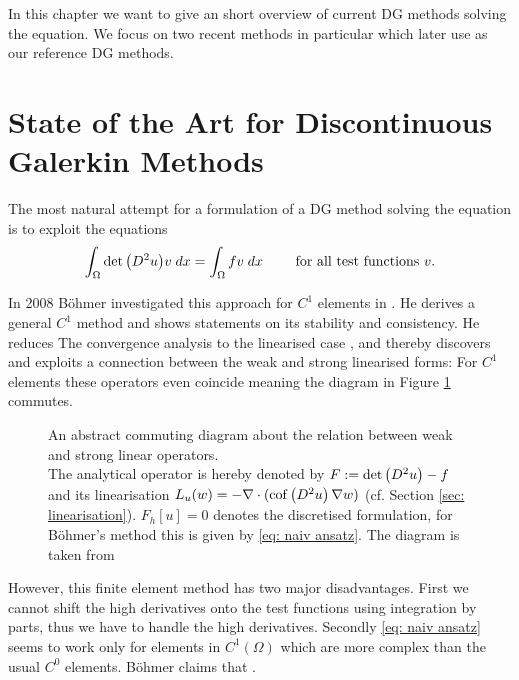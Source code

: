 In this chapter we want to give an short overview of current DG methods solving the \MA equation. We focus on two recent methods \cite{BGN+2011, Neilan2014} in particular which later use as our reference DG methods.

\section{State of the Art for Discontinuous Galerkin Methods} %

The most natural attempt for a formulation of a DG method solving the \MA equation is to exploit the equations
\begin{align}
	\int_{\Omega} {{\det{\left(D^2 u\right)} v}\;dx} = \int_{\Omega} {{fv}\;dx} \qquad \text{ for all test functions } v. \label{eq: naiv ansatz}
\end{align}

In 2008 B\"ohmer investigated this approach for $C^1$ elements in \cite{Boehmer2008}. He derives a general $C^1$ method and shows statements on its stability and consistency. 
He reduces The convergence analysis to the linearised case \cite[Section 9]{Boehmer2008}, and thereby discovers and exploits a connection between the weak and strong linearised forms: For $C^1$ elements these operators even coincide meaning the diagram in Figure \ref{fig: fe diagram} commutes.
\begin{figure}[H]
	
	\caption{An abstract commuting diagram about the relation between weak and strong linear operators.\\ The analytical \MA operator is hereby denoted by $F:=\det{\left(D^2 u\right)} -f $ and its linearisation $L_u(w) = -\nabla \cdot (\operatorname{cof} \left( D^2 u \right) \nabla w)$ (cf. Section \ref{sec: linearisation}). $F_h[u]=0$ denotes the discretised formulation, for B\"ohmer's method this is given by \eqref{eq: naiv ansatz}. The diagram is taken from \cite[Fig 2.2]{FGN2013}}
	\label{fig: fe diagram}	
\end{figure}
However, this finite element method has two major disadvantages. 
First we cannot shift the high derivatives onto the test functions using integration by parts, thus we have to handle the high derivatives. Secondly \eqref{eq: naiv ansatz} seems to work only for elements in $C^1(\Omega)$ which are more complex than the usual $C^0$ elements. B\"ohmer claims that \cite[p.1214]{Boehmer2008}.

